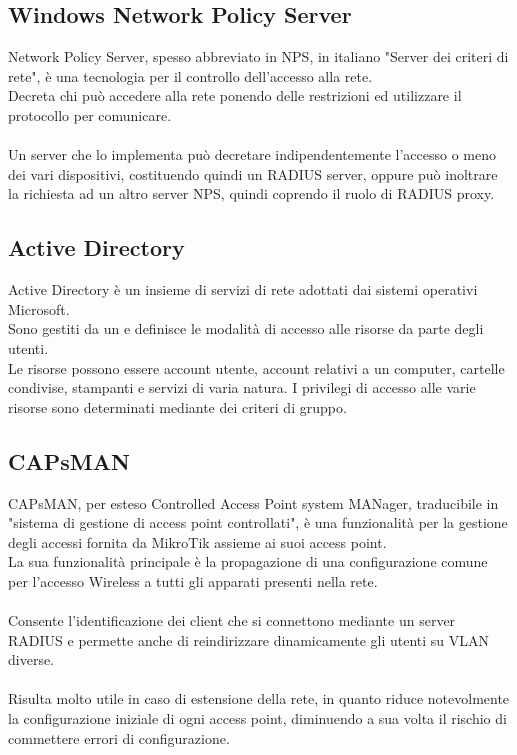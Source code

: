 \documentclass[Tesi.tex]{subfiles}
\begin{document}
\subsection{Windows Network Policy Server}
Network Policy Server, spesso abbreviato in NPS, in italiano "Server dei criteri di rete", è una tecnologia per il controllo dell'accesso alla rete. \\
Decreta chi può accedere alla rete ponendo delle restrizioni ed utilizzare il protocollo  per comunicare. \\\\
Un server che lo implementa può decretare indipendentemente l'accesso o meno dei vari dispositivi, costituendo quindi un RADIUS server, oppure può inoltrare la richiesta ad un altro server NPS, quindi coprendo il ruolo di RADIUS proxy.

\subsection{Active Directory}
Active Directory è un insieme di servizi di rete adottati dai sistemi operativi Microsoft. \\
Sono gestiti da un  e definisce le modalità di accesso alle risorse da parte degli utenti. \\
Le risorse possono essere account utente, account relativi a un computer, cartelle condivise, stampanti e servizi di varia natura. I privilegi di accesso alle varie risorse sono determinati mediante dei criteri di gruppo.

\subsection{CAPsMAN}
CAPsMAN, per esteso Controlled Access Point system MANager, traducibile in "sistema di gestione di access point controllati", è una funzionalità per la gestione degli accessi fornita da MikroTik assieme ai suoi access point. \\
La sua funzionalità principale è la propagazione di una configurazione comune per l'accesso Wireless a tutti gli apparati presenti nella rete. \\\\
Consente l'identificazione dei client che si connettono mediante un server RADIUS e permette anche di reindirizzare dinamicamente gli utenti su VLAN diverse. \\\\
Risulta molto utile in caso di estensione della rete, in quanto riduce notevolmente la configurazione iniziale di ogni access point, diminuendo a sua volta il rischio di commettere errori di configurazione.
\end{document}

